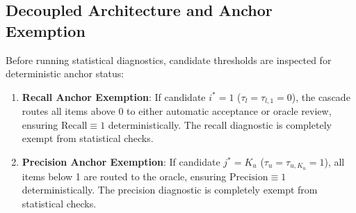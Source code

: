 \documentclass[11pt,a4paper]{article}
\begin{document}
\subsection{Decoupled Architecture and Anchor Exemption}
Before running statistical diagnostics, candidate thresholds are inspected for deterministic anchor status:
\begin{enumerate}[leftmargin=*]
    \item \textbf{Recall Anchor Exemption}: If candidate $i^* = 1$ ($\tau_l = \tau_{l, 1} = 0$), the cascade routes all items above 0 to either automatic acceptance or oracle review, ensuring $\text{Recall} \equiv 1$ deterministically. The recall diagnostic is completely exempt from statistical checks.
    \item \textbf{Precision Anchor Exemption}: If candidate $j^* = K_u$ ($\tau_u = \tau_{u, K_u} = 1$), all items below 1 are routed to the oracle, ensuring $\text{Precision} \equiv 1$ deterministically. The precision diagnostic is completely exempt from statistical checks.
\end{enumerate}
\end{document}
